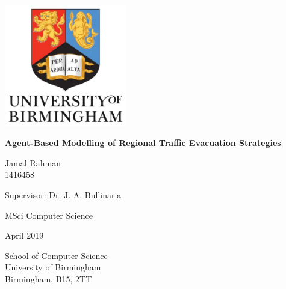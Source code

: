 \begin{titlepage}
   \begin{center}
        \vspace*{1cm}
        
        \includegraphics[width=0.4\textwidth]{images/crest.jpg}
        \vspace{2.5cm}
    
        {\Large\textbf{Agent-Based Modelling of Regional Traffic Evacuation Strategies}}
 
        \vspace{2.5cm}
 
        Jamal Rahman\\
        1416458\\
 
        \vspace{0.5cm}
        
        Supervisor: Dr. J. A. Bullinaria
 
        \vspace{0.5cm}
        
        MSci Computer Science
        
        \vspace{0.5cm}
        
        April 2019
 
       \vfill
 
       \vspace{0.8cm}
 
 
       School of Computer Science\\
       University of Birmingham\\
       Birmingham, B15, 2TT\\
 
   \end{center}
\end{titlepage}